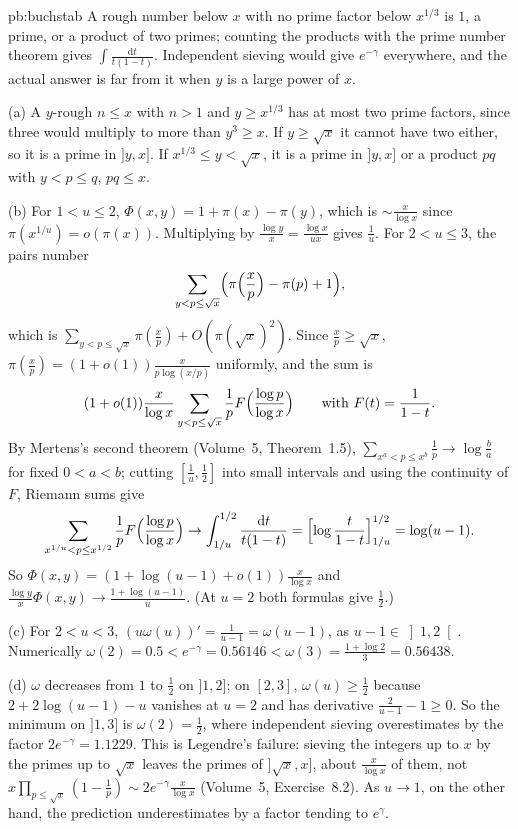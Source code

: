 \begin{solution}{pb:buchstab}
\idea A rough number below $x$ with no prime factor below $x^{1/3}$ is $1$, a prime, or a product of two primes; counting the products with the prime number theorem gives
$\int\frac{\mathrm dt}{t(1-t)}$. Independent sieving would give $e^{-\gamma}$ everywhere, and the actual answer is far from it when $y$ is a large power of $x$.

\writeup (a) A $y$-rough $n\le x$ with $n>1$ and $y\ge x^{1/3}$ has at most two prime factors, since three would multiply to more than $y^3\ge x$. If $y\ge\sqrt x$ it cannot have two
either, so it is a prime in $]y,x]$. If $x^{1/3}\le y<\sqrt x$, it is a prime in $]y,x]$ or a product $pq$ with $y<p\le q$, $pq\le x$.

(b) For $1<u\le2$, $\Phi(x,y)=1+\pi(x)-\pi(y)$, which is $\sim\frac x{\log x}$ since $\pi(x^{1/u})=o(\pi(x))$. Multiplying by $\frac{\log y}x=\frac{\log x}{ux}$ gives $\frac1u$.
For $2<u\le3$, the pairs number
\[
\sum_{y<p\le\sqrt x}\Bigl(\pi\Bigl(\frac xp\Bigr)-\pi(p)+1\Bigr),
\]
which is $\sum_{y<p\le\sqrt x}\pi(\frac xp)+O(\pi(\sqrt x)^2)$.
Since $\frac xp\ge\sqrt x$, $\pi(\frac xp)=(1+o(1))\frac{x}{p\log(x/p)}$ uniformly, and the sum is
\[
(1+o(1))\frac x{\log x}\sum_{y<p\le\sqrt x}\frac1pF\Bigl(\frac{\log p}{\log x}\Bigr)\qquad\text{with }F(t)=\frac1{1-t}.
\] By Mertens's
second theorem (Volume~5, Theorem~1.5), $\sum_{x^a<p\le x^b}\frac1p\to\log\frac ba$ for fixed $0<a<b$; cutting $[\frac1u,\frac12]$ into small intervals and using the continuity of $F$, Riemann sums give
\[
\sum_{x^{1/u}<p\le x^{1/2}}\frac1pF\Bigl(\frac{\log p}{\log x}\Bigr)\to\int_{1/u}^{1/2}\frac{\mathrm dt}{t(1-t)}=\Bigl[\log\frac t{1-t}\Bigr]_{1/u}^{1/2}=\log(u-1).
\]
So $\Phi(x,y)=(1+\log(u-1)+o(1))\frac x{\log x}$ and $\frac{\log y}x\Phi(x,y)\to\frac{1+\log(u-1)}u$. (At $u=2$ both formulas give $\frac12$.)

(c) For $2<u<3$, $(u\omega(u))'=\frac1{u-1}=\omega(u-1)$, as $u-1\in\left]1,2\right[$. Numerically $\omega(2)=0.5<e^{-\gamma}=0.56146<\omega(3)=\frac{1+\log2}3=0.56438$.

(d) $\omega$ decreases from $1$ to $\frac12$ on $]1,2]$; on $[2,3]$, $\omega(u)\ge\frac12$ because $2+2\log(u-1)-u$ vanishes at $u=2$ and has derivative $\frac2{u-1}-1\ge0$. So the minimum on $]1,3]$ is
$\omega(2)=\frac12$, where independent sieving overestimates by the factor $2e^{-\gamma}=1.1229$. This is Legendre's failure: sieving the integers up to $x$ by the primes up to $\sqrt x$
leaves the primes of $]\sqrt x,x]$, about $\frac x{\log x}$ of them, not $x\prod_{p\le\sqrt x}(1-\frac1p)\sim2e^{-\gamma}\frac x{\log x}$ (Volume~5, Exercise~8.2). As $u\to1$, on the other hand, the prediction
underestimates by a factor tending to $e^\gamma$.


\end{solution}
